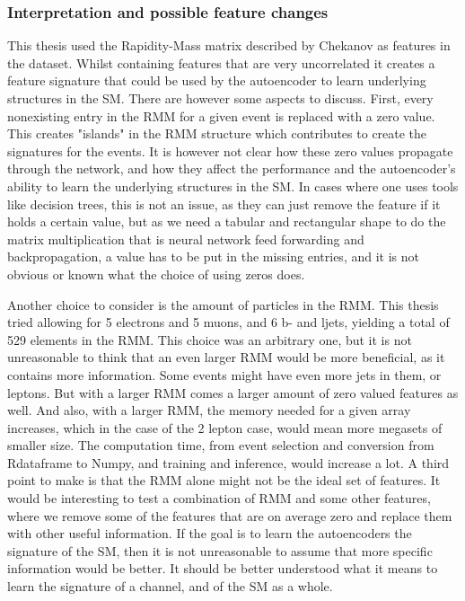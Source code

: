 \subsubsection*{Interpretation and possible feature changes}
This thesis used the Rapidity-Mass matrix described by Chekanov\cite{Chekanov_2019} as features in the dataset. 
Whilst containing features that are very uncorrelated it creates a feature signature that could be used by 
the autoencoder to learn underlying structures in the SM. There are however some aspects to discuss. 
First, every nonexisting entry in the RMM for a given event is replaced with a zero value. This creates 
"islands" in the RMM structure which contributes to create the signatures for the events. It is however not clear 
how these zero values propagate through the network, and how they affect the performance and the autoencoder's 
ability to learn the underlying structures in the SM. In cases where one uses tools like decision trees, 
this is not an issue, as they can just remove the feature if it holds a certain value, but as we need a tabular and 
rectangular shape to do the matrix multiplication that is neural network feed forwarding and backpropagation, a value
has to be put in the missing entries, and it is not obvious or known what the choice of using zeros does. \par 
Another choice to consider is the amount of particles in the RMM. This thesis tried allowing for 5 electrons and 5 muons, 
and 6 b- and ljets, yielding a total of 529 elements in the RMM. This choice was an arbitrary one, but it is not 
unreasonable to think that an even larger RMM would be more beneficial, as it contains more information. Some 
events might have even more jets in them, or leptons. But with a larger RMM comes a larger amount of zero valued 
features as well. And also, with a larger RMM, the memory needed for a given array increases, which in the case of
the 2 lepton case, would mean more megasets of smaller size. The computation time, from event selection and conversion from Rdataframe to Numpy, and training 
and inference, would increase a lot. A third point to make is that the RMM alone might not be the ideal set of features. 
It would be interesting to test a combination of RMM and some other features, where we remove some of the features that are
on average zero and replace them with other useful information. If the goal is to learn the autoencoders the signature 
of the SM, then it is not unreasonable to assume that more specific information would be better. It should be better understood 
what it means to learn the signature of a channel, and of the SM as a whole. \par 





